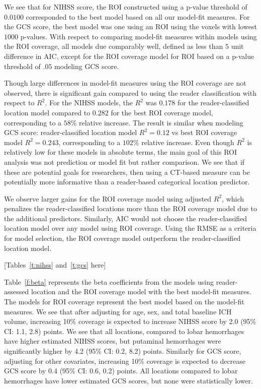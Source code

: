 \documentclass[10pt]{article}\usepackage[]{graphicx}\usepackage[]{color}
\begin{document}
We see that for NIHSS score, the ROI constructed using a p-value threshold of $0.0100$ corresponded to the best model based on all our model-fit measures.  For the GCS score, the best model was one using an ROI using the voxels with lowest $1000$ p-values.  With respect to comparing model-fit measures within models using the ROI coverage, all models due comparably well, defined as less than $5$ unit difference in AIC, except for the ROI coverage model for ROI based on a p-value threshold of $.05$ modeling GCS score.

Though large differences in model-fit measures using the ROI coverage are not observed, there is significant gain compared to using the reader classification with respect to $R^2$.
For the NIHSS models, the $R^2$ was $0.178$ for the reader-classified location model compared to $0.282$ for the best ROI coverage model, corresponding to a $58\%$ relative increase.  The result is similar when modeling GCS score: reader-classified location model $R^2 = 0.12$ vs best ROI coverage model $R^2 = 0.243$, corresponding to a $102\%$ relative increase.  Even though $R^2$ is relatively low for these models in absolute terms, the main goal of this ROI analysis was not prediction or model fit but rather comparison.  We see that if these are potential goals for researchers, then using a CT-based measure can be potentially more informative than a reader-based categorical location predictor. 

We observe larger gains for the ROI coverage model using adjusted $R^2$, which penalizes the reader-classified locations more than the ROI coverage model due to the additional predictors.  Similarly, AIC would not choose the reader-classified location model over any model using ROI coverage.  Using the RMSE as a criteria for model selection, the ROI coverage model outperform the reader-classified location model.  


[Tables~\ref{t:nihss} and~\ref{t:gcs} here]


Table~\ref{f:beta} represents the beta coefficients from the models using reader-assessed location and the ROI coverage model with the best model-fit measures.  The models for ROI coverage represent the best model based on the model-fit measures. We see that after adjusting for age, sex, and total baseline ICH volume, increasing 10\% coverage is expected to increase NIHSS score by 2.0 (95\% CI: 1.1, 2.8) points.  We see that all locations, compared to lobar hemorrhages have higher estimated NIHSS scores, but putaminal hemorrhages were significantly higher by 4.2 (95\% CI: 0.2, 8.2) points. 
Similarly for GCS score, adjusting for other covariates, increasing 10\% coverage is expected to decrease GCS score by 0.4 (95\% CI: 0.6, 0.2) points.  All locations compared to lobar hemorrhages have lower estimated GCS scores, but none were statistically lower.
\end{document}
